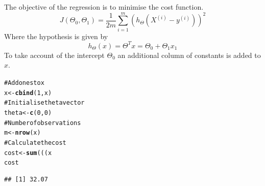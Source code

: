 \documentclass[12pt, a4paper, oneside]{article}\usepackage{graphicx, color}
\makeatletter
\newcommand{\hlfunctioncall}[1]{\textcolor[rgb]{0.501960784313725,0,0.329411764705882}{\textbf{#1}}}%
\newcommand{\hlcomment}[1]{\textcolor[rgb]{0.180392156862745,0.6,0.341176470588235}{#1}}%
\newenvironment{kframe}{%
 \def\at@end@of@kframe{}%
 \ifinner\ifhmode%
  \def\at@end@of@kframe{\end{minipage}}%
  \begin{minipage}{\columnwidth}%
 \fi\fi%
 \def\FrameCommand##1{\hskip\@totalleftmargin \hskip-\fboxsep
 \colorbox{shadecolor}{##1}\hskip-\fboxsep
     \hskip-\linewidth \hskip-\@totalleftmargin \hskip\columnwidth}%
 \MakeFramed {\advance\hsize-\width
   \@totalleftmargin\z@ \linewidth\hsize
   \@setminipage}}%
 {\par\unskip\endMakeFramed%
 \at@end@of@kframe}
\newenvironment{knitrout}{}{} %
\makeatother
\begin{document}
The objective of the regression is to minimise the cost function.
\begin{equation}
J(\Theta_0, \Theta_1) = \frac{1}{2m} \sum_{i=1}^m (h_{\Theta}(X^{(i)} - y^{(i)}))^2
\end{equation}
Where the hypothesis is given by 
\begin{equation}
h_{\Theta}(x) = \Theta^Tx = \Theta_0 + \Theta_1x_1
\end{equation}
To take account of the intercept $\Theta_0$ an additional column of constants is added to $x$. 

\begin{knitrout}
\color{fgcolor}\begin{kframe}
\begin{alltt}
\hlcomment{# Add ones to x}
x <- \hlfunctioncall{cbind}(1, x)
\hlcomment{# Initialise theta vector}
theta <- \hlfunctioncall{c}(0, 0)
\hlcomment{# Number of observations}
m <- \hlfunctioncall{nrow}(x)
\hlcomment{# Calculate the cost}
cost <- \hlfunctioncall{sum}(((x %
cost
\end{alltt}
\begin{verbatim}
## [1] 32.07
\end{verbatim}
\end{kframe}
\end{knitrout}
\end{document}

